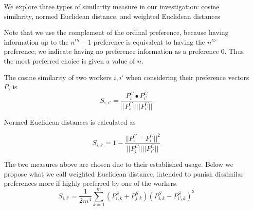 We explore three types of similarity measure in our investigation: cosine similarity, normed Euclidean distance, and weighted Euclidean distances

Note that we use the complement of the ordinal preference, because having information up to the  $n^{th} - 1$ preference is equivalent to having the $n^{th}$ preference; we indicate having no preference information as a preference 0. Thus the most preferred choice is given a value of $n$. 

The cosine similarity of two workers $i, i'$ when considering their preference vectors $P$, is
\[S_{i, i'} = \frac{P^C_{i} \bullet P^C_{i'}}{||P^C_i|| ||P^C_{i'}||}\]

Normed Euclidean distances is calculated as

\[S_{i, i'} = 1- \frac{||P^C_i - P^C_{i'}||^2}{||P^C_i|| ||P^C_{i'}||}\]

The two measures above are chosen due to their established usage. Below we propose what we call weighted Euclidean distance, intended to punish dissimilar preferences more if highly preferred by one of the workers. 
\[S_{i, i'} = \frac{1}{2m^4} \sum_{k=1}^{m} (P^S_{i,k} + P^S_{j,k})(P^S_{i,k} - P^S_{i',k})^2\]